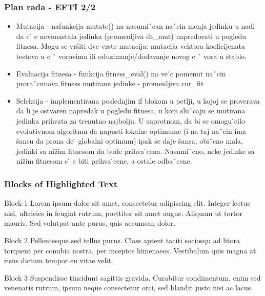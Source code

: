 \documentclass{beamer}
\begin{document}

\begin{frame}
\frametitle{Plan rada - EFTI 2/2}
\begin{itemize}
\item Mutacija - nafunkcija mutate() na nasumiˇcan naˇcin menja jedinku u nadi da c  ́ e novonastala
jedinka (promenljiva dt_mut) napredovati u pogledu fitnesa. Mogu se vršiti dve vrste
mutacija: mutacija vektora koeficijenata testova u c ˇ vorovima ili oduzimanje/dodavanje
novog c ˇ vora u stablo.
\item Evaluacija fitnesa - funkcija fitness_eval() na ve ́c pomenut naˇcin proraˇcunava fitness
mutirane jedinke - promenljiva cur_fit
\item Selekcija - implementirana poslednjim if blokom u petlji, u kojoj se proverava da li
je ostvaren napredak u pogledu fitnesa, u kom sluˇcaju se mutirana jedinka prihvata za
trenutno najbolju. U suprotnom, da bi se omogu ́cilo evolutivnom algoritmu da napusti
lokalne optimume (i na taj naˇcin ima šansu da prona de
 ̄ globalni optimum) ipak se daje
šansa, obiˇcno mala, jedinki sa nižim fitnesom da bude prihva ́cena. Nasumiˇcno, neke
jedinke sa nižim fitnesom c  ́ e biti prihva ́cene, a ostale odbaˇcene.
\end{itemize}
\end{frame}


\begin{frame}
\frametitle{Blocks of Highlighted Text}
\begin{block}{Block 1}
Lorem ipsum dolor sit amet, consectetur adipiscing elit. Integer lectus nisl, ultricies in feugiat rutrum, porttitor sit amet augue. Aliquam ut tortor mauris. Sed volutpat ante purus, quis accumsan dolor.
\end{block}

\begin{block}{Block 2}
Pellentesque sed tellus purus. Class aptent taciti sociosqu ad litora torquent per conubia nostra, per inceptos himenaeos. Vestibulum quis magna at risus dictum tempor eu vitae velit.
\end{block}

\begin{block}{Block 3}
Suspendisse tincidunt sagittis gravida. Curabitur condimentum, enim sed venenatis rutrum, ipsum neque consectetur orci, sed blandit justo nisi ac lacus.
\end{block}
\end{frame}
\end{document}
